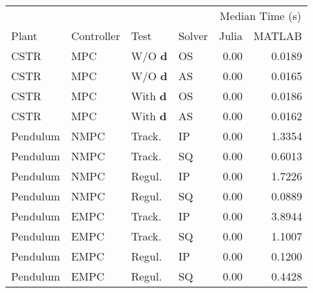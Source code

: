 \begin{tabular}{llllrr}
	
\toprule %

	  &	& & & \multicolumn{2}{c}{Median Time (s)} \\ \cmidrule(l){5-6}
Plant & Controller & Test & Solver & Julia & MATLAB \\
\midrule %

CSTR		& MPC	& W/O $\mathbf{d}$	& OS & \num{0.00} & \num{0.0189}	\\
CSTR		& MPC	& W/O $\mathbf{d}$	& AS & \num{0.00} & \num{0.0165}	\\
CSTR		& MPC	& With $\mathbf{d}$ & OS & \num{0.00} & \num{0.0186}	\\
CSTR		& MPC	& With $\mathbf{d}$ & AS & \num{0.00} & \num{0.0162}	\\
Pendulum 	& NMPC	& Track. 	   		& IP & \num{0.00} & \num{1.3354}	\\
Pendulum 	& NMPC	& Track. 	   		& SQ & \num{0.00} & \num{0.6013}	\\
Pendulum    & NMPC	& Regul. 			& IP & \num{0.00} & \num{1.7226} 	\\
Pendulum    & NMPC	& Regul. 			& SQ & \num{0.00} & \num{0.0889} 	\\
Pendulum    & EMPC	& Track.			& IP & \num{0.00} & \num{3.8944} 	\\
Pendulum    & EMPC	& Track.			& SQ & \num{0.00} & \num{1.1007} 	\\
Pendulum	& EMPC	& Regul. 			& IP & \num{0.00} & \num{0.1200}  	\\
Pendulum	& EMPC	& Regul. 			& SQ & \num{0.00} & \num{0.4428}  	\\
	
\bottomrule %
	
\end{tabular}